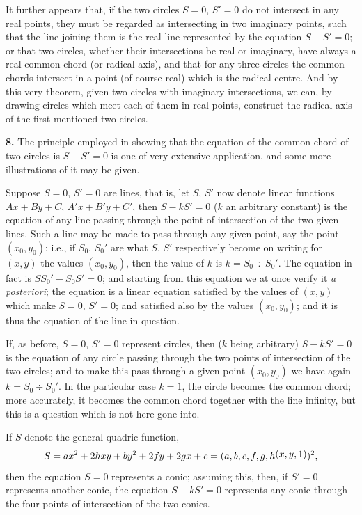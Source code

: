 \documentclass[11pt,a4paper]{article}
\theoremstyle{definition}
\begin{document}
It further appears that, if the two circles $S=0$, $S'=0$ do not intersect in any real points, they must be regarded as intersecting in two imaginary points, such that the line joining them is the real line represented by the equation $S-S'=0$; or that two circles, whether their intersections be real or imaginary, have always a real common chord (or radical axis), and that for any three circles the common chords intersect in a point (of course real) which is the radical centre. And by this very theorem, given two circles with imaginary intersections, we can, by drawing circles which meet each of them in real points, construct the radical axis of the first-mentioned two circles.

\textbf{8.} The principle employed in showing that the equation of the common chord of two circles is $S-S'=0$ is one of very extensive application, and some more illustrations of it may be given.

Suppose $S=0$, $S'=0$ are lines, that is, let $S$, $S'$ now denote linear functions $Ax+By+C$, $A'x+B'y+C'$, then $S-kS'=0$ ($k$ an arbitrary constant) is the equation of any line passing through the point of intersection of the two given lines. Such a line may be made to pass through any given point, say the point $(x_0,y_0)$; i.e., if $S_0$, $S_0'$ are what $S$, $S'$ respectively become on writing for $(x,y)$ the values $(x_0,y_0)$, then the value of $k$ is $k=S_0\div S_0'$. The equation in fact is $S S_0' - S_0 S' = 0$; and starting from this equation we at once verify it \textit{a posteriori}; the equation is a linear equation satisfied by the values of $(x,y)$ which make $S=0$, $S'=0$; and satisfied also by the values $(x_0,y_0)$; and it is thus the equation of the line in question.

If, as before, $S=0$, $S'=0$ represent circles, then ($k$ being arbitrary) $S-kS'=0$ is the equation of any circle passing through the two points of intersection of the two circles; and to make this pass through a given point $(x_0,y_0)$ we have again $k=S_0\div S_0'$. In the particular case $k=1$, the circle becomes the common chord; more accurately, it becomes the common chord together with the line infinity, but this is a question which is not here gone into.

If $S$ denote the general quadric function,
\[
S = ax^2 + 2hxy + by^2 + 2fy + 2gx + c = (a,b,c,f,g,h\,\raisebox{0.5ex}{\text{$\!(x,y,1)$}})^2,
\]
then the equation $S=0$ represents a conic; assuming this, then, if $S'=0$ represents another conic, the equation $S-kS'=0$ represents any conic through the four points of intersection of the two conics.
\end{document}
